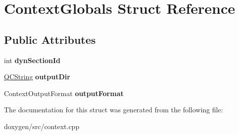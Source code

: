 \hypertarget{struct_context_globals}{}\section{Context\+Globals Struct Reference}
\label{struct_context_globals}
\subsection*{Public Attributes}
\begin{DoxyCompactItemize}
\item 
\mbox{\label{struct_context_globals_aa8f55e29c7473839278831567228fed2}} 
int {\bfseries dyn\+Section\+Id}
\item 
\mbox{\label{struct_context_globals_a258997491223c384351384e24c73a63e}} 
\mbox{\hyperlink{class_q_c_string}{Q\+C\+String}} {\bfseries output\+Dir}
\item 
\mbox{\label{struct_context_globals_ac63f8ff2b05d14db4764c0ba481f81ce}} 
Context\+Output\+Format {\bfseries output\+Format}
\end{DoxyCompactItemize}


The documentation for this struct was generated from the following file\+:\begin{DoxyCompactItemize}
\item 
doxygen/src/context.\+cpp\end{DoxyCompactItemize}
